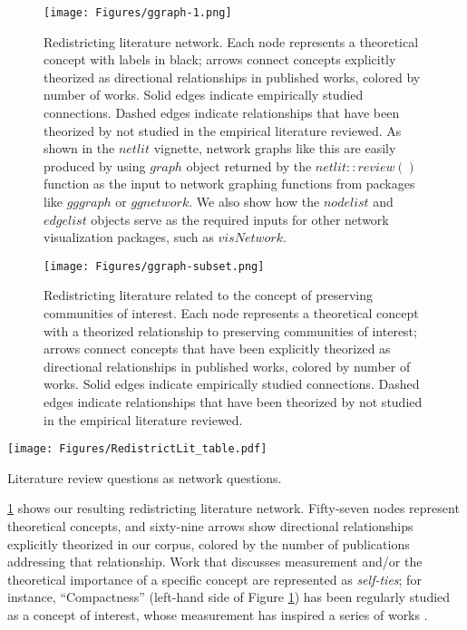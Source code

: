 \documentclass{cup-pan}
\begin{document}
\begin{figure}[bt]
\centering
\texttt{[image: Figures/ggraph-1.png]}
\caption{Redistricting literature network. Each node represents a theoretical concept with labels in black; arrows connect concepts explicitly theorized as directional relationships in published works, colored by number of works. Solid edges indicate empirically studied connections. Dashed edges indicate relationships that have been theorized by not studied in the empirical literature reviewed. As shown in the $netlit$ vignette, network graphs like this are easily produced by using $graph$ object returned by the $netlit::review()$ function as the input to network graphing functions from packages like $gggraph$ or $ggnetwork$. We also show how the $nodelist$ and $edgelist$ objects serve as the required inputs for other network visualization packages, such as $visNetwork$.}
\label{fig:fullnetwork}
\end{figure}

\begin{figure}[bt]
\centering
\texttt{[image: Figures/ggraph-subset.png]}
\caption{Redistricting literature related to the concept of preserving communities of interest. Each node represents a theoretical concept with a theorized relationship to preserving communities of interest; arrows connect concepts that have been explicitly theorized as directional relationships in published works, colored by number of works. Solid edges indicate empirically studied connections. Dashed edges indicate relationships that have been theorized by not studied in the empirical literature reviewed.}
\label{fig:subset}
\end{figure}



\begin{table}[hbtp]
\centering
\texttt{[image: Figures/RedistrictLit\_table.pdf]}
\caption{Literature review questions as network questions.}
\label{tab:relit}
\end{table}





\ref{fig:fullnetwork} shows our resulting redistricting literature network. Fifty-seven nodes represent theoretical concepts, and sixty-nine arrows show directional relationships explicitly theorized in our corpus, colored by the number of publications addressing that relationship. Work that discusses measurement and/or the theoretical importance of a specific concept are represented as \textit{self-ties}; for instance, ``Compactness'' (left-hand side of Figure \ref{fig:fullnetwork}) has been regularly studied as a concept of interest, whose measurement has inspired a series of works \citep{barnes_gerrymandering_2021, magleby_new_2018, deassis_redistricting_2014, chen_cutting_2015, tam_toward_2016, saxon_reviving_2020}. \\
\end{document}
